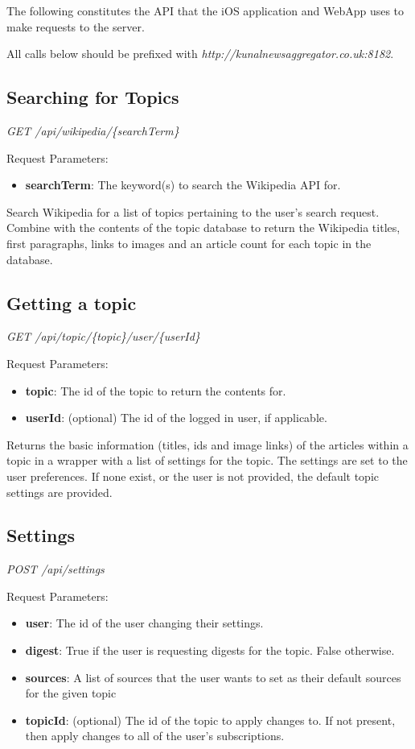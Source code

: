 \documentclass[12pt]{article}
\begin{document}
\begin{appendices}
The following constitutes the API that the iOS application and WebApp uses to make requests to the server.

All calls below should be prefixed with \emph{http://kunalnewsaggregator.co.uk:8182}.

\subsection{Searching for Topics}

\emph{GET	/api/wikipedia/\{searchTerm\}}

Request Parameters:
\begin{itemize}
	\item \textbf{searchTerm}: The keyword(s) to search the Wikipedia API for.
\end{itemize}

Search Wikipedia \cite{wikipedia} for a list of topics pertaining to the user's search request. Combine with the contents of the topic database to return the Wikipedia titles, first paragraphs, links to images and an article count for each topic in the database.

\subsection{Getting a topic}

\emph{GET	/api/topic/\{topic\}/user/\{userId\}}

Request Parameters:
\begin{itemize}
	\item \textbf{topic}: The id of the topic to return the contents for.
	\item \textbf{userId}: (optional) The id of the logged in user, if applicable.
\end{itemize}

Returns the basic information (titles, ids and image links) of the articles within a topic in a wrapper with a list of settings for the topic. The settings are set to the user preferences. If none exist, or the user is not provided, the default topic settings are provided.

\subsection{Settings}

\emph{POST	/api/settings}

Request Parameters:
\begin{itemize}
	\item \textbf{user}: The id of the user changing their settings.
	\item \textbf{digest}: True if the user is requesting digests for the topic. False otherwise.
	\item \textbf{sources}: A list of sources that the user wants to set as their default sources for the given topic
	\item \textbf{topicId}: (optional) The id of the topic to apply changes to. If not present, then apply changes to all of the user's subscriptions.
\end{itemize}


\end{appendices}
\end{document}
